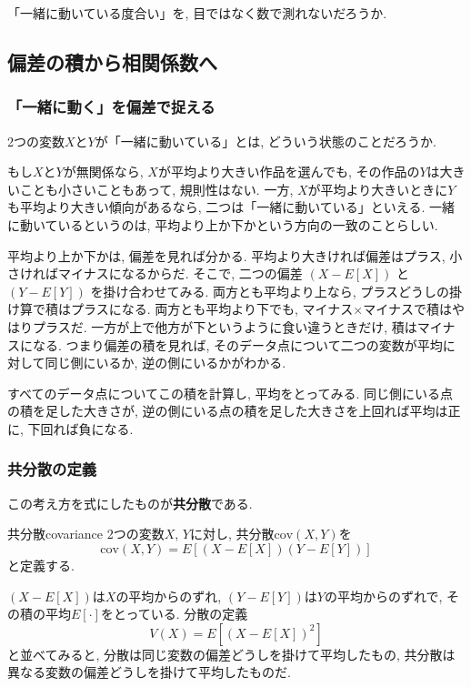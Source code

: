 「一緒に動いている度合い」を, 目ではなく数で測れないだろうか.


\subsection{偏差の積から相関係数へ}

\subsubsection*{「一緒に動く」を偏差で捉える}

2つの変数$X$と$Y$が「一緒に動いている」とは, どういう状態のことだろうか.

もし$X$と$Y$が無関係なら, $X$が平均より大きい作品を選んでも, その作品の$Y$は大きいことも小さいこともあって, 規則性はない.
一方, $X$が平均より大きいときに$Y$も平均より大きい傾向があるなら, 二つは「一緒に動いている」といえる.
一緒に動いているというのは, 平均より上か下かという方向の一致のことらしい.

平均より上か下かは, 偏差を見れば分かる.
平均より大きければ偏差はプラス, 小さければマイナスになるからだ.
そこで, 二つの偏差 $(X - E[X])$ と $(Y - E[Y])$ を掛け合わせてみる.
両方とも平均より上なら, プラスどうしの掛け算で積はプラスになる.
両方とも平均より下でも, マイナス$\times$マイナスで積はやはりプラスだ.
一方が上で他方が下というように食い違うときだけ, 積はマイナスになる.
つまり偏差の積を見れば, そのデータ点について二つの変数が平均に対して同じ側にいるか, 逆の側にいるかがわかる.

すべてのデータ点についてこの積を計算し, 平均をとってみる.
同じ側にいる点の積を足した大きさが, 逆の側にいる点の積を足した大きさを上回れば平均は正に, 下回れば負になる.

\subsubsection*{共分散の定義}

この考え方を式にしたものが\textbf{共分散}である.

\begin{defi}[]{共分散}{covariance}
2つの変数$X$, $Y$に対し, 共分散$\mathrm{cov}(X,Y)$を
\[
\mathrm{cov}(X,Y) = E[(X - E[X])(Y - E[Y])]
\]
と定義する.
\end{defi}

$(X - E[X])$は$X$の平均からのずれ, $(Y - E[Y])$は$Y$の平均からのずれで, その積の平均$E[\cdot]$をとっている.
分散の定義
\[
V(X) = E[(X - E[X])^2]
\]
と並べてみると, 分散は同じ変数の偏差どうしを掛けて平均したもの, 共分散は異なる変数の偏差どうしを掛けて平均したものだ.


